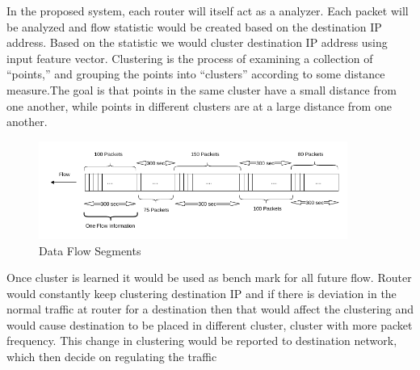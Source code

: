 \documentclass[10pt,oneside,a4paper]{report}
\begin{document}
In the proposed system, each router will itself act as a analyzer. Each packet will be analyzed and flow statistic would be created based on the destination IP address. Based on the statistic we would cluster destination IP address using input feature vector. Clustering is the process of examining a collection of “points,” and grouping the points into “clusters” according to some distance measure.The goal is that
points in the same cluster have a small distance from one another, while points in different clusters are at a large distance from one another\cite{clusterning}.

\begin{figure}[H]
  \centering
    \includegraphics[width=0.90\textwidth]{Data_Flow_Capture}
    \caption{Data Flow Segments}
\end{figure}


Once cluster is learned it would be used as bench mark for all future flow. Router would constantly keep clustering destination IP and if there is deviation in the normal traffic at router for a destination then that would affect the clustering and would cause destination to be placed in different cluster, cluster with more packet frequency. This change in clustering would be reported to destination network, which then decide on regulating the traffic\par
\end{document}
